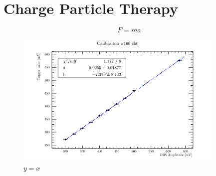 \chapter{Charge Particle Therapy}

\lipsum[1-3]

\begin{equation}
    F = ma
\end{equation}



\begin{figure}
    \centering    
        \includegraphics[width=10cm]{figures/ch0.pdf}
        \caption{$y=x$}
        \label{fig:y equals x}
\end{figure}







